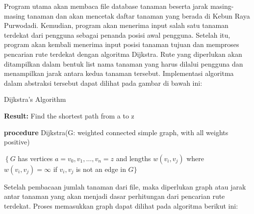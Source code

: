 \documentclass[10pt]{IEEEtran}
\begin{document}
Program utama akan membaca file database tanaman
beserta jarak masing-masing tanaman dan akan mencetak
daftar tanaman yang berada di Kebun Raya Purwodadi.
Kemudian, program akan menerima input salah satu tanaman
terdekat dari pengguna sebagai penanda posisi awal pengguna.
Setelah itu, program akan kembali menerima input posisi
tanaman tujuan dan memproses pencarian rute terdekat dengan
algoritma Dijkstra. Rute yang diperlukan akan ditampilkan
dalam bentuk list nama tanaman yang harus dilalui pengguna
dan menampilkan jarak antara kedua tanaman tersebut.
Implementasi algoritma dalam abstraksi tersebut dapat dilihat
pada gambar di bawah ini:

\begin{algorithm}

\caption{Dijkstra’s Algorithm}
\label{alg:two}

\textbf{Result:} Find the shortest path from a to $\mathrm{z}$

\textbf{procedure} Dijkstra(G: weighted connected simple graph, with all weights positive)

$\left\{G\right.$ has vertices $a=v_{0}, v_{1}, \ldots, v_{n}=z$ and lengths $w\left(v_{i}, v_{j}\right)$ where $w\left(v_{i}, v_{j}\right)=\infty$ if $v_{i}, v_{j}$ is not an edge in $G\}$

\end{algorithm}

Setelah pembacaan jumlah tanaman dari file, maka diperlukan 
graph atau jarak antar tanaman yang akan menjadi dasar
perhitungan dari pencarian rute terdekat. Proses memasukkan
graph dapat dilihat pada algoritma berikut ini:
\end{document}
